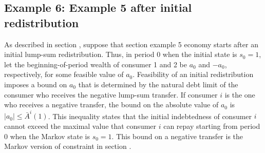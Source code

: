 \subsection{Example 6: Example 5 after initial redistribution}
As described in section , suppose that section   example 5
economy starts after an initial lump-sum redistribution.
Thus, in period $0$ when the initial state
is $s_0=1$, let the beginning-of-period wealth of 
consumer 1 and 2 be $a_0$ and $-a_0$, respectively,
for some feasible value of $a_0$. Feasibility of an initial redistribution imposes a bound on $a_0$ that is 
determined by the natural debt limit
of the consumer who receives the negative lump-sum
transfer. If consumer $i$ is the one who receives
a negative transfer, the bound on the absolute value
of $a_0$ is $|a_0|\leq \bar A^i(1)$. This inequality states that the initial indebtedness of consumer $i$ cannot 
exceed the maximal value that consumer $i$ can repay 
starting from period $0$ when the Markov state is 
$s_0=1$. This bound on a negative transfer is the
Markov version of constraint 
in section .

